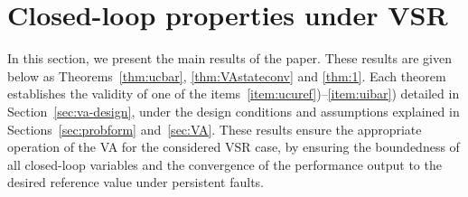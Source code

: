 \documentclass[letterpaper, 10 pt, conference]{ieeeconf}
\begin{document}
\section{Closed-loop properties under VSR}
\label{sec:cl-props}
In this section, we present the main results of the paper. These results are given below as Theorems~\ref{thm:ucbar}, \ref{thm:VAstateconv} and \ref{thm:1}. Each theorem establishes the validity of one of the items~\ref{item:ucuref})--\ref{item:uibar}) detailed in Section~\ref{sec:va-design}, under the design conditions and assumptions explained in Sections~\ref{sec:probform} and~\ref{sec:VA}. These
results ensure the appropriate operation of the VA for the considered
VSR case, by ensuring the boundedness of all closed-loop variables and the convergence of the performance output to the desired reference value under persistent faults.
\end{document}
